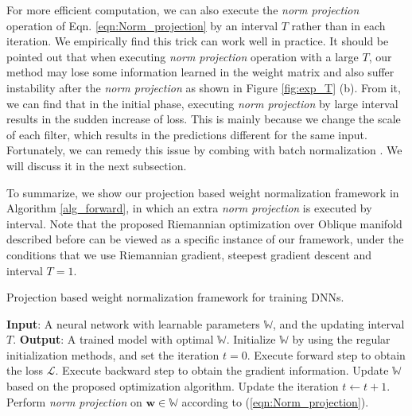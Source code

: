 \documentclass[twocolumn]{article}
\newcommand{\TODO}[1]{\textcolor{red}{TODO: }\textcolor{red}{\emph{#1}}}
\begin{document}

For more efficient computation, we  can also execute the\emph{ norm projection} operation of Eqn. \ref{eqn:Norm_projection} by an interval $T$ rather than in each iteration. We empirically find this trick can work well in practice. It should be pointed out that when executing \emph{norm projection} operation with a large $T$, our method may lose some information learned in the weight matrix and also suffer instability after the\emph{ norm projection} as shown in Figure \ref{fig:exp_T} (b). From it, we can find that in the initial phase, executing \emph{norm projection} by large interval results in the sudden increase of loss. This is mainly because we change the scale of each filter, which results in the predictions different for the same input. Fortunately, we can remedy this issue by combing with batch normalization \cite{2015_ICML_Ioffe}. We will discuss it in the next subsection.

To summarize, we show our projection  based weight normalization framework in Algorithm \ref{alg_forward}, in which an extra \emph{norm projection} is executed by interval. Note that the proposed Riemannian optimization over Oblique manifold described before can be viewed as a specific instance of our framework, under the conditions that we use Riemannian gradient, steepest gradient descent and interval $T=1$.


\begin{algorithm}[]
   \caption{Projection based weight normalization framework for training DNNs.}
   \label{alg_forward}
  \begin{small}
\begin{algorithmic}[1]

   \STATE \textbf{Input}: A neural network with learnable parameters $\mathbb{W}$, and the updating interval $T$.
     \STATE \textbf{Output}: A trained model with optimal $\mathbb{W}$.
   \STATE Initialize $\mathbb{W}$ by using the regular initialization methods, and set the iteration $t=0$.
    \STATE	Execute forward step to obtain the loss $\mathcal{L}$.
    \STATE	Execute backward step to obtain the gradient information.
    \STATE	Update $\mathbb{W}$ based on the proposed optimization algorithm.
    \STATE  Update the iteration $t\leftarrow t+1$.
           \STATE Perform \emph{norm projection} on $\mathbf{w} \in \mathbb{W}$ according to (\ref{eqn:Norm_projection}).
     \ENDIF
    \ENDWHILE
\end{algorithmic}
\end{small}
\end{algorithm}
\end{document}
